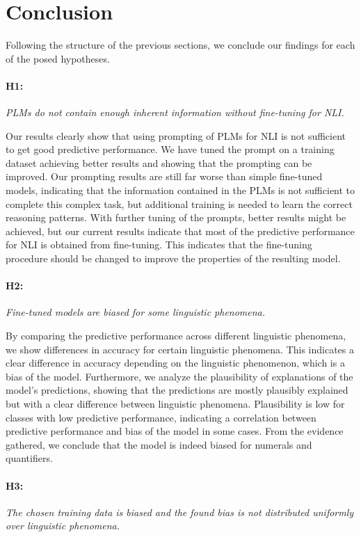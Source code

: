 \section{Conclusion} \label{sec:conclusion}
Following the structure of the previous sections, we conclude our findings for each of the posed hypotheses.

\paragraph{H1:} \textit{\acp{PLM} do not contain enough inherent information without fine-tuning for \ac{NLI}.}

Our results clearly show that using prompting of \acp{PLM} for \ac{NLI} is not sufficient to get good predictive performance. We have tuned the prompt on a training dataset achieving better results and showing that the prompting can be improved. Our prompting results are still far worse than simple fine-tuned models, indicating that the information contained in the \acp{PLM} is not sufficient to complete this complex task, but additional training is needed to learn the correct reasoning patterns. With further tuning of the prompts, better results might be achieved, but our current results indicate that most of the predictive performance for \ac{NLI} is obtained from fine-tuning. This indicates that the fine-tuning procedure should be changed to improve the properties of the resulting model.

\paragraph{H2:} \textit{Fine-tuned models are biased for some linguistic phenomena.}

By comparing the predictive performance across different linguistic phenomena, we show differences in accuracy for certain linguistic phenomena. This indicates a clear difference in accuracy depending on the linguistic phenomenon, which is a bias of the model. Furthermore, we analyze the plausibility of explanations of the model's predictions, showing that the predictions are mostly plausibly explained but with a clear difference between linguistic phenomena. Plausibility is low for classes with low predictive performance, indicating a correlation between predictive performance and bias of the model in some cases. From the evidence gathered, we conclude that the model is indeed biased for numerals and quantifiers.

\paragraph{H3:} \textit{The chosen training data is biased and the found bias is not distributed uniformly over linguistic phenomena.}

